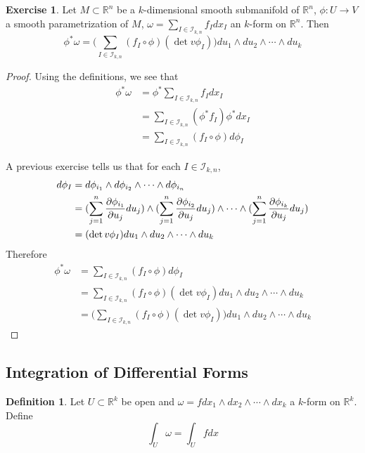 \documentclass[12pt]{amsart}
\theoremstyle{definition}
\newtheorem{defn}[definition]{Definition}
\theoremstyle{remark}
\theoremstyle{definition}
\newtheorem{ex}[definition]{Exercise}
\newcommand{\om}{\omega}
\newcommand{\R}{\mathbb{R}}
\newcommand{\MI}{\mathcal{I}}
\begin{document}
	\begin{ex}
			Let $M \subset \R^n$ be a $k$-dimensional smooth submanifold of $\R^n$, $\phi: U \rightarrow V$ a smooth parametrization of $M$, $\om = \sum_{I \in \MI_{k,n}} f_Idx_I$  an $k$-form on $\R^n$. Then $$\phi^* \om = \bigg( \sum_{I \in \MI_{k, n}} (f_I \circ \phi) (\det v\phi_I)\bigg)du_1 \wedge du_2 \wedge \cdots \wedge du_k$$ 
	\end{ex}

	\begin{proof}
		Using the definitions, we see that 
		\begin{align*}
			\phi^* \om 
			&= \phi^*  \sum_{I \in \MI_{k,n}} f_Idx_I \\
			&= \sum_{I \in \MI_{k,n}} (\phi^*f_I) \phi^*dx_I \\
			&= \sum_{I \in \MI_{k,n}} (f_I \circ  \phi)  d\phi_I
		\end{align*}
	
	A previous exercise tells us that for each $I \in \MI_{k,n}$,
	\begin{align*}
		d \phi_I 
		&= d\phi_{i_1} \wedge d\phi_{i_2} \wedge \cdots \wedge d \phi_{i_n} \\
		&= (\sum_{j = 1}^n \pdv{\phi_{i_1}}{u_j} du_j) \wedge (\sum_{j = 1}^n \pdv{\phi_{i_2}}{u_j} du_j) \wedge \cdots \wedge (\sum_{j = 1}^n \pdv{\phi_{i_k}}{u_j} du_j)   \\
		&= (\det v\phi_I)du_1 \wedge du_2 \wedge \cdots \wedge du_k
	\end{align*}
	Therefore 
	\begin{align*}
		\phi^* \om
		&= \sum_{I \in \MI_{k,n}} (f_I \circ  \phi)  d\phi_I \\
		&= \sum_{I \in \MI_{k,n}} (f_I \circ  \phi)  (\det v\phi_I)du_1 \wedge du_2 \wedge \cdots \wedge du_k \\
		&= \bigg(\sum_{I \in \MI_{k,n}} (f_I \circ  \phi)  (\det v\phi_I)\bigg)du_1 \wedge du_2 \wedge \cdots \wedge du_k
	\end{align*}
	\end{proof}
	
	\subsection{Integration of Differential Forms}
	
	\begin{defn}
		Let $U \subset \R^k$ be open and $\om = f dx_1 \wedge dx_2 \wedge \cdots \wedge dx_k$ a $k$-form on $\R^k$. Define $$\int_U \om = \int_U f dx$$
	\end{defn}
	
\end{document}
